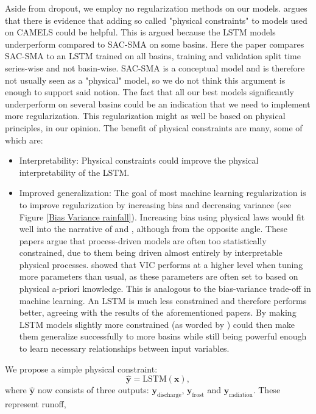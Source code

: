 Aside from dropout, we employ no regularization methods on our models. \citet{lstm_third_paper} 
argues that there is evidence that adding so called "physical constraints" to 
models used on CAMELS could be helpful. This is argued because the LSTM models 
underperform compared to SAC-SMA on some basins. Here the paper compares SAC-SMA 
to an LSTM trained on all basins, training and validation split time series-wise 
and not basin-wise. SAC-SMA is a conceptual model and is therefore not usually seen 
as a "physical" model, so we do not think this argument is enough to support said 
notion. The fact that all our best models significantly underperform on 
several basins could be an indication that we need to implement more regularization. 
This regularization might as well be based on physical principles, in our opinion. 
The benefit of physical constraints are many, some of which are:
\begin{itemize}
\item Interpretability: Physical constraints could improve the physical interpretability 
of the LSTM.
\item Improved generalization: The goal of most machine learning regularization is 
to improve regularization by increasing bias and decreasing variance (see Figure 
\ref{Bias Variance rainfall}). Increasing bias using physical laws would fit well 
into the narrative of \citet{BiasVarianceVIC} and \citet{VICbench}, although from 
the opposite angle. These papers argue that process-driven models are often too 
statistically constrained, due to them being driven almost entirely by interpretable 
physical processes. \citet{VICbench} showed that VIC performs at a higher level 
when tuning more parameters than usual, as these parameters are often set to based 
on physical a-priori knowledge. This is analogous to the bias-variance trade-off 
in machine learning. An LSTM is much less constrained and therefore performs better, 
agreeing with the results of the aforementioned papers. By making LSTM models 
slightly more constrained (as worded by \citet{BiasVarianceVIC}) could then make 
them generalize successfully to more basins while still being powerful enough to 
learn necessary relationships between input variables.
\end{itemize}
We propose a simple physical constraint:
\begin{equation}
\bm{\hat{y}} = \text{LSTM}(\bm{x}),
\end{equation}
where $\bm{\hat{y}}$ now consists of three outputs: $\bm{y}_\text{discharge}$, 
$\bm{y}_\text{frost}$ and $\bm{y}_\text{radiation}$. These represent runoff, 
